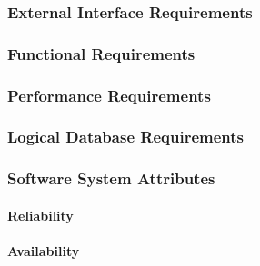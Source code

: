 \documentclass[12pt,a4paper]{report}
\begin{document}
\subsubsection{External Interface Requirements}

\subsubsection{Functional Requirements}

\subsubsection{Performance Requirements}

\subsubsection{Logical Database Requirements}

\subsubsection{Software System Attributes}
\paragraph{Reliability}

\paragraph{Availability}
\end{document}
